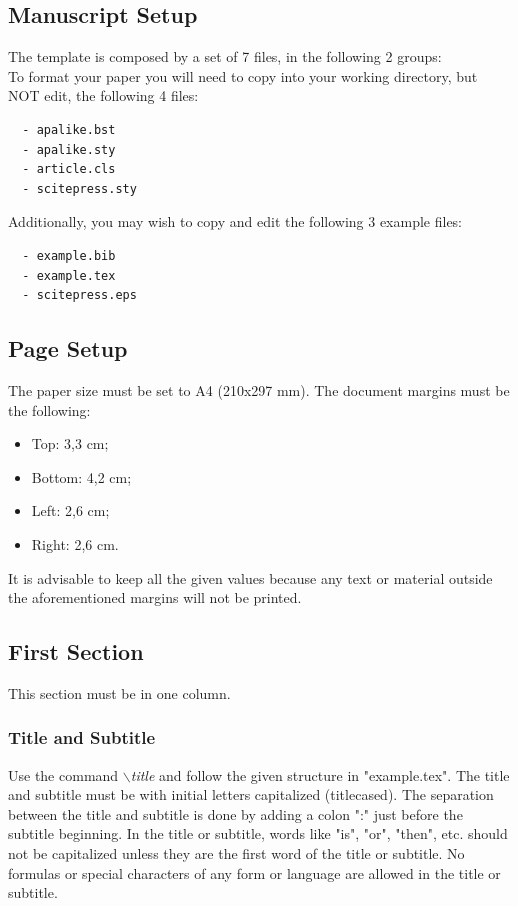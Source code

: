 \documentclass[a4paper,twoside]{article}
\begin{document}
\subsection{Manuscript Setup}

The template is composed by a set of 7 files, in the
following 2 groups:\\
 To format your paper you will need to copy
into your working directory, but NOT edit, the following 4 files:
\begin{verbatim}
  - apalike.bst
  - apalike.sty
  - article.cls
  - scitepress.sty
\end{verbatim}

 Additionally, you may wish to copy and edit
the following 3 example files:
\begin{verbatim}
  - example.bib
  - example.tex
  - scitepress.eps
\end{verbatim}


\subsection{Page Setup}

The paper size must be set to A4 (210x297 mm). The document
margins must be the following:

\begin{itemize}
    \item Top: 3,3 cm;
    \item Bottom: 4,2 cm;
    \item Left: 2,6 cm;
    \item Right: 2,6 cm.
\end{itemize}

It is advisable to keep all the given values because any text or
material outside the aforementioned margins will not be printed.


\subsection{First Section}

This section must be in one column.

\subsubsection{Title and Subtitle}

Use the command \textit{$\backslash$title} and follow the given structure in "example.tex". The title and subtitle must be with initial letters
capitalized (titlecased). The separation between the title and subtitle is done by adding a colon ":" just before the subtitle beginning. In the title or subtitle, words like "is", "or", "then", etc. should not be capitalized unless they are the first word of the title or subtitle. No formulas or special characters of any form or language are allowed in the title or subtitle.
\end{document}
